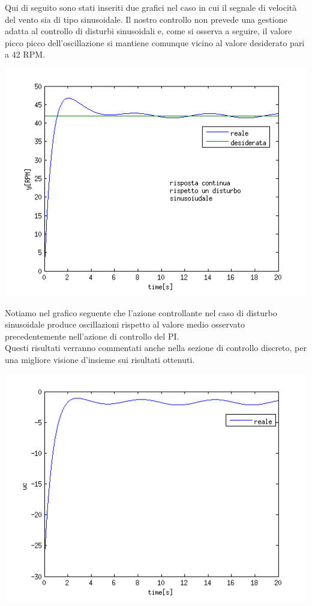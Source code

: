 \documentclass[a4paper,13pt]{article}
\begin{document}
	Qui di seguito sono stati inseriti due grafici nel caso in cui il segnale di velocità del vento sia di tipo 				sinusoidale. Il nostro controllo non prevede una gestione adatta al controllo di disturbi sinusoidali e, come si 			osserva a seguire, il valore picco picco dell'oscillazione si mantiene comunque vicino al valore desiderato pari a 42 		RPM. \\
\begin{center}
\includegraphics[scale=0.6]{graph/ycontsin.png}
\end{center}
	Notiamo nel grafico seguente che l'azione controllante nel caso di disturbo sinusoidale produce oscillazioni rispetto 		al valore medio osservato precedentemente nell'azione di controllo del PI.\\ Questi risultati verranno commentati 			anche nella sezione di controllo discreto, per una migliore visione d'insieme sui risultati ottenuti. \\
\begin{center}
\includegraphics[scale=0.6]{graph/ucontsin.png}
\end{center}
\end{document}
